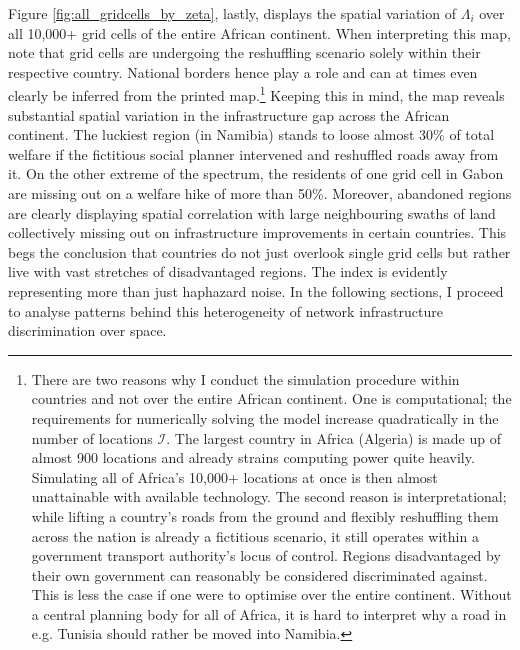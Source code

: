 \documentclass[11pt, oneside]{article}   	%
\begin{document}
Figure \eqref{fig:all_gridcells_by_zeta}, lastly, displays the spatial variation of $\Lambda_{i}$ over all 10,000+ grid cells of the entire African continent. When interpreting this map, note that grid cells are undergoing the reshuffling scenario solely within their respective country. National borders hence play a role and can at times even clearly be inferred from the printed map.\footnote{There are two reasons why I conduct the simulation procedure within countries and not over the entire African continent. One is computational; the requirements for numerically solving the model increase quadratically in the number of locations $\mathcal{I}$. The largest country in Africa (Algeria) is made up of almost 900 locations and already strains computing power quite heavily. Simulating all of Africa's 10,000+ locations at once is then almost unattainable with available technology. The second reason is interpretational; while lifting a country's roads from the ground and flexibly reshuffling them across the nation is already a fictitious scenario, it still operates within a government transport authority's locus of control. Regions disadvantaged by their own government can reasonably be considered discriminated against. This is less the case if one were to optimise over the entire continent. Without a central planning body for all of Africa, it is hard to interpret why a road in e.g. Tunisia should rather be moved into Namibia.}  Keeping this in mind, the map reveals substantial spatial variation in the infrastructure gap across the African continent. The luckiest region (in Namibia) stands to loose almost 30\% of total welfare if the fictitious social planner intervened and reshuffled roads away from it. On the other extreme of the spectrum, the residents of one grid cell in Gabon are missing out on a welfare hike of more than 50\%. Moreover, abandoned regions are clearly displaying spatial correlation with large neighbouring swaths of land collectively missing out on infrastructure improvements in certain countries. This begs the conclusion that countries do not just overlook single grid cells but rather live with vast stretches of disadvantaged regions. The index is evidently representing more than just haphazard noise. In the following sections, I proceed to analyse patterns behind this heterogeneity of network infrastructure discrimination over space.
\end{document}
